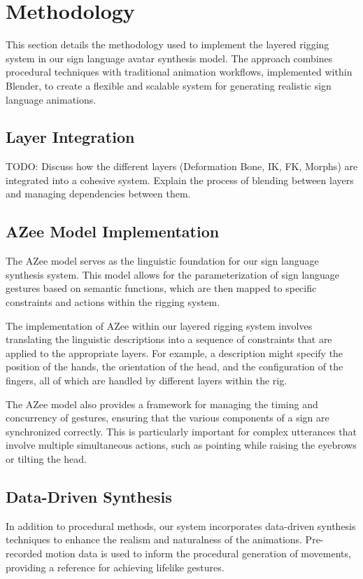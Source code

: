 \documentclass[../../main.tex]{subfiles}
\begin{document}
\section{Methodology}
This section details the methodology used to implement the layered rigging system in our sign language avatar synthesis model. The approach combines procedural techniques with traditional animation workflows, implemented within Blender, to create a flexible and scalable system for generating realistic sign language animations.

\subsection{Layer Integration}
TODO: Discuss how the different layers (Deformation Bone, IK, FK, Morphs) are integrated into a cohesive system. Explain the process of blending between layers and managing dependencies between them.

\subsection{AZee Model Implementation}
The AZee model serves as the linguistic foundation for our sign language synthesis system. This model allows for the parameterization of sign language gestures based on semantic functions, which are then mapped to specific constraints and actions within the rigging system.

The implementation of AZee within our layered rigging system involves translating the linguistic descriptions into a sequence of constraints that are applied to the appropriate layers. For example, a description might specify the position of the hands, the orientation of the head, and the configuration of the fingers, all of which are handled by different layers within the rig.

The AZee model also provides a framework for managing the timing and concurrency of gestures, ensuring that the various components of a sign are synchronized correctly. This is particularly important for complex utterances that involve multiple simultaneous actions, such as pointing while raising the eyebrows or tilting the head.

\subsection{Data-Driven Synthesis}
In addition to procedural methods, our system incorporates data-driven synthesis techniques to enhance the realism and naturalness of the animations. Pre-recorded motion data is used to inform the procedural generation of movements, providing a reference for achieving lifelike gestures.
\end{document}
